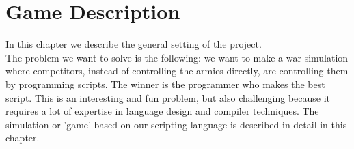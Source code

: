 \chapter{Game Description}
In this chapter we describe the general setting of the project. \\
The problem we want to solve is the following: we want to make a war simulation where competitors, 
instead of controlling the armies directly, are controlling them by programming scripts. The winner is the programmer who makes the best script. 
This is an interesting and fun problem, but also challenging because it requires a lot of expertise in language design and compiler techniques.
The simulation or 'game' based on our scripting language is described in detail in this chapter.